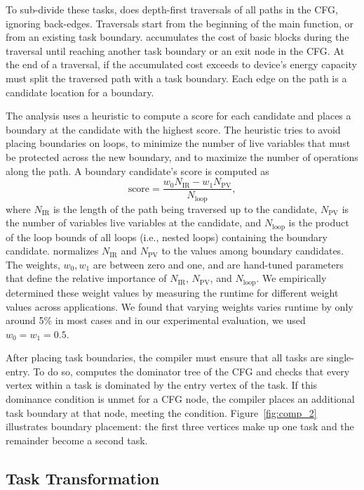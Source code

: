 To sub-divide these tasks, \sys does depth-first traversals of all paths in the CFG, ignoring back-edges. Traversals start from the beginning of the main function, or from an existing task boundary. \sys accumulates the cost of basic blocks during the traversal until reaching another task boundary or an exit node in the CFG. At the end of a traversal, if the accumulated cost exceeds to device's energy capacity \sys must split the traversed path with a task boundary. Each edge on the path is a candidate location for a boundary.

The analysis uses a heuristic to compute a score for each candidate and places a boundary at the candidate with the highest score. The heuristic tries to avoid placing boundaries on loops, to minimize the number of live variables that must be protected across the new boundary, and to maximize the number of operations along the path. A boundary candidate's score is computed as
%
\begin{equation}
\text{score} = \frac{w_{0} N_{\text{IR}} - w_{1} N_{\text{PV}}}{N_{\text{loop}}},\nonumber
\end{equation}
%
where $N_{\text{IR}}$ is the length of the path being traversed up to the candidate, $N_{\text{PV}}$ is the number of variables live variables at the candidate, and $N_{\text{loop}}$ is the product of the loop bounds of all loops (i.e., nested loops) containing the boundary candidate. \sys normalizes $N_{\text{IR}}$ and $N_{\text{PV}}$ to the values among boundary candidates. The weights, $w_{0}, w_{1}$ are between zero and one, and are hand-tuned parameters that define the relative importance of $N_{\text{IR}}$,
$N_{\text{PV}}$, and $N_{\text{loop}}$. We empirically determined these weight values by measuring the runtime for different weight values across applications. We found that varying weights varies runtime by only around 5\% in most cases and in our experimental evaluation, we used $w_{0} = w_{1} = 0.5$.

After placing task boundaries, the compiler must ensure that all tasks are single-entry. To do so, \sys computes the dominator tree of the CFG and checks that every vertex within a task is dominated by the entry vertex of the task. If this dominance condition is unmet for a CFG node, the compiler places an additional task boundary at that node, meeting the condition. Figure~\ref{fig:comp_2} illustrates boundary placement: the first three vertices make up one task and the remainder become a second task.

\subsection{Task Transformation}
\label{sec:compiler_transform_pass}

